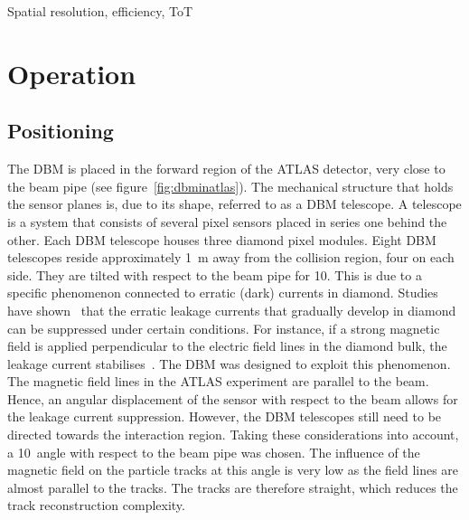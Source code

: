 \documentclass[12pt]{packages/mytustyle}  %
\begin{document}
Spatial resolution, efficiency, ToT


\section{Operation}
\label{sec:operation}

\subsection{Positioning}
The DBM is placed in the forward region of the ATLAS detector, very close to the beam pipe (see figure~\ref{fig:dbminatlas}). The mechanical structure that holds the sensor planes is, due to its shape, referred to as a DBM telescope. A telescope is a system that consists of several pixel sensors placed in series one behind the other. Each DBM telescope houses three diamond pixel modules. Eight DBM telescopes reside approximately 1~m away from the collision region, four on each side. They are tilted with respect to the beam pipe for 10\textdegree. This is due to a specific phenomenon connected to erratic (dark) currents in diamond. Studies have shown~\cite{} that the erratic leakage currents that gradually develop in diamond can be suppressed under certain conditions. For instance, if a strong magnetic field is applied perpendicular to the electric field lines in the diamond bulk, the leakage current stabilises~\cite{}. The DBM was designed to exploit this phenomenon. The magnetic field lines in the ATLAS experiment are parallel to the beam. Hence, an angular displacement of the sensor with respect to the beam allows for the leakage current suppression. However, the DBM telescopes still need to be directed towards the interaction region. Taking these considerations into account, a 10\textdegree~angle with respect to the beam pipe was chosen. The influence of the magnetic field on the particle tracks at this angle is very low as the field lines are almost parallel to the tracks. The tracks are therefore straight, which reduces the track reconstruction complexity.
\end{document}
